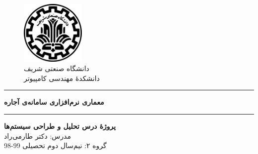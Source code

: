 \begin{center}
	\null
	\vspace{1cm}
\begin{figure}[H]
	\centering
	\includegraphics[width=0.275\textwidth]{sharif-logo-fa.png}
	\caption*{دانشگاه صنعتی شریف\\
		\large{
	دانشکدهٔ مهندسی کامپیوتر}
}
\end{figure}
\vspace{1 cm}
\hrule
\vspace{.5cm}
\fontsize{28}{28}\textbf{
معماری نرم‌افزاری سامانه‌ی آجاره
}
\\
\vspace{.5cm}
\hrule
\vspace{1cm}
\fontsize{16}{16}\textbf{
پروژهٔ درس تحلیل و طراحی سیستم‌ها\\
}
\vspace{1.5cm}
\normalfont
\large{
مدرس:
دکتر طارمی‌راد\\}
\vspace{2 cm}
\fontsize{13}{13}
گروه ۲:
\fontsize{14}{14}{\selectfont
	\makecell{\teamMemOne\\ \stdIdOne}
	\makecell{\teamMemTwo\\ \stdIdTwo}
	\makecell{\teamMemThree\\ \stdIdThree}
	\makecell{\teamMemFour\\ \stdIdFour}
}
\normalsize
\vfill{نیم‌سال دوم تحصیلی 99-98}
\end{center}
\thispagestyle{empty}